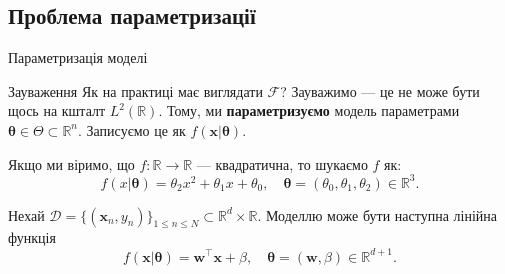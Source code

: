 \documentclass{zkdl-presentation-template}
\begin{document}
    \subsection{Проблема параметризації}
    \begin{frame}{Параметризація моделі}
        \begin{block}{Зауваження}
            Як на практиці має виглядати $\mathcal{F}$? Зауважимо --- це не може
            бути щось на кшталт $L^2(\mathbb{R})$. Тому, ми
            \textbf{параметризуємо} модель параметрами $\boldsymbol{\theta} \in
            \Theta \subset \mathbb{R}^n$. Записуємо це як
            $f(\boldsymbol{x}|\boldsymbol{\theta})$.\pause
        \end{block}

        \begin{example}
            Якщо ми віримо, що $f: \mathbb{R} \to \mathbb{R}$ --- квадратична, то
            шукаємо $f$ як:
            \begin{equation*}
                f(x|\boldsymbol{\theta}) = \theta_2 x^2 + \theta_1 x + \theta_0, \quad \boldsymbol{\theta} = (\theta_0, \theta_1, \theta_2) \in \mathbb{R}^3.
            \end{equation*}
        \end{example}

        \pause\begin{example}
            Нехай $\mathcal{D} = \{(\boldsymbol{x}_n,y_n)\}_{1 \leq n \leq N}
            \subset \mathbb{R}^d \times \mathbb{R}$. Моделлю може бути наступна
            лінійна функція
            \begin{equation*}
                f(\boldsymbol{x}|\boldsymbol{\theta}) = \boldsymbol{w}^{\top} \boldsymbol{x} + \beta, \quad \boldsymbol{\theta} = (\boldsymbol{w}, \beta) \in \mathbb{R}^{d+1}.
            \end{equation*}
        \end{example}
    \end{frame}
\end{document}
